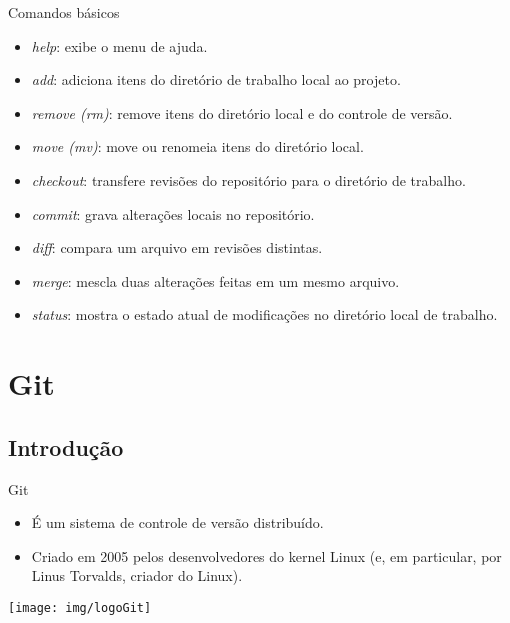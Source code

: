 \documentclass[a4paper]{beamer}
\begin{document}
\begin{frame}{Comandos básicos}
\begin{itemize}[<+->]

\item \textit{help}: exibe o menu de ajuda.

\item \textit{add}: adiciona itens do diretório de trabalho local ao projeto.

\item \textit{remove (rm)}: remove itens do diretório local e do controle de versão.

\item \textit{move (mv)}: move ou renomeia itens do diretório local.

\item \textit{checkout}: transfere revisões do repositório para o diretório de trabalho.

\item \textit{commit}: grava alterações locais no repositório.

\item \textit{diff}: compara um arquivo em revisões distintas.

\item \textit{merge}: mescla duas alterações feitas em um mesmo arquivo.

\item \textit{status}: mostra o estado atual de modificações no diretório local de trabalho.

\end{itemize}
\end{frame}

\section{Git}

\subsection{Introdução}

\begin{frame}{Git}

\begin{itemize}
\item É um sistema de controle de versão distribuído.
\item Criado em 2005 pelos desenvolvedores do kernel Linux (e, em particular, por Linus Torvalds, criador do Linux).
\end{itemize}

\vspace{20pt}
\begin{center}
\texttt{[image: img/logoGit]}
\end{center}

\end{frame}
\end{document}
